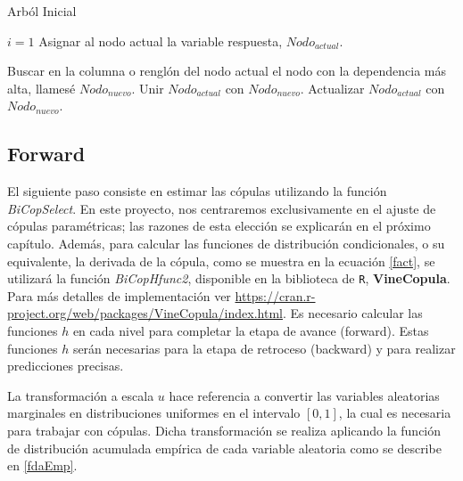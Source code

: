 \begin{algorithm}[H]
      \caption{Arból Inicial}
      \label{algT1}
      \begin{algorithmic}[1]  
        
        \State $i = 1$
        \State Asignar al nodo actual la variable respuesta, $Nodo_{actual}$.
        
          \State Buscar en la columna o renglón del nodo actual el nodo con la dependencia más alta, llamesé $Nodo_{nuevo}$.
          \State Unir $Nodo_{actual}$ con $Nodo_{nuevo}$.
          \State Actualizar $Nodo_{actual}$ con $Nodo_{nuevo}$.     
        \EndWhile
       
      \end{algorithmic}
    \end{algorithm}


\subsection{Forward}

El siguiente paso consiste en estimar las cópulas utilizando la función \textit{BiCopSelect}. En este proyecto, nos centraremos exclusivamente en el ajuste de cópulas paramétricas; las razones de esta elección se explicarán en el próximo capítulo. Además, para calcular las funciones de distribución condicionales, o su equivalente, la derivada de la cópula, como se muestra en la ecuación \eqref{fact}, se utilizará la función \textit{BiCopHfunc2}, disponible en la biblioteca de \texttt{R}, \textbf{VineCopula}. Para más detalles de implementación ver \url{https://cran.r-project.org/web/packages/VineCopula/index.html}. Es necesario calcular las funciones $h$ en cada nivel para completar la etapa de avance (forward). Estas funciones $h$ serán necesarias para la etapa de retroceso (backward) y para realizar predicciones precisas.

La transformación a escala $u$ hace referencia a convertir las variables aleatorias marginales en distribuciones uniformes en el intervalo $[0, 1]$, la cual es necesaria para trabajar con cópulas. Dicha transformación se realiza aplicando la función de distribución acumulada empírica de cada variable aleatoria como se describe en \eqref{fdaEmp}.

